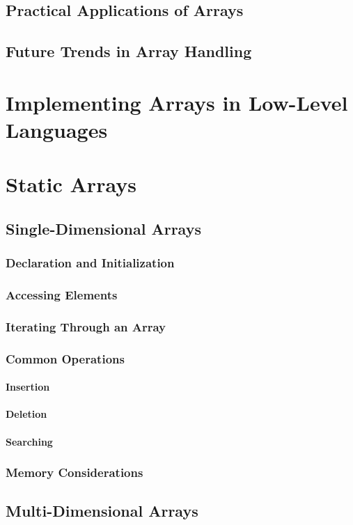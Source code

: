 \documentclass[12pt, oneside]{book}
\begin{document}
	\section{Practical Applications of Arrays}
	\section{Future Trends in Array Handling}
	\chapter{Implementing Arrays in Low-Level Languages}
	\chapter{Static Arrays}
	\section{Single-Dimensional Arrays}
	\subsection{Declaration and Initialization}
	\subsection{Accessing Elements}
	\subsection{Iterating Through an Array}
	\subsection{Common Operations}
	\subsubsection{Insertion}
	\subsubsection{Deletion}
	\subsubsection{Searching}
	\subsection{Memory Considerations}
	\section{Multi-Dimensional Arrays}
\end{document}
